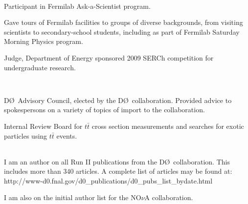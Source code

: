 \documentclass[amsmath,amssymb]{revtex4}
\def\dzero{D\O}
\begin{document}
\\
\begin{list}{}
            {\setlength{\itemsep}{0.0in}\setlength{\parsep}{0.0in}
             \addtolength{\parskip}{-0.5in}}
\item Participant in Fermilab Ask-a-Scientist program.
\item Gave tours of Fermilab facilities to groups of diverse backgrounds, from visiting scientists
to secondary-school students, including as part of Fermilab Saturday Morning Physics program.
\item Judge, Department of Energy sponsored 2009 SERCh competition for undergraduate research.
\end{list}

\\
\begin{list}{}
            {\setlength{\itemsep}{0.0in}\setlength{\parsep}{0.0in}
             \addtolength{\parskip}{-0.5in}}
\item \dzero~Advisory Council, elected by the \dzero~collaboration.  Provided
  advice to spokespersons on a variety of topics of import to the collaboration.
\item Internal Review Board for $t{\bar t}$ cross section measurements and
  searches for exotic particles using $t{\bar t}$ events.
\end{list}

{} \\

I am an author on all Run II publications from the \dzero\ collaboration. This includes
more than 340 articles.  A complete list of articles may be found at:
http://www-d0.fnal.gov/d0\_publications/d0\_pubs\_list\_bydate.html

I am also on the initial author list for the NO$\nu$A collaboration.\\



%
%
\newpage
{}
\end{document}
